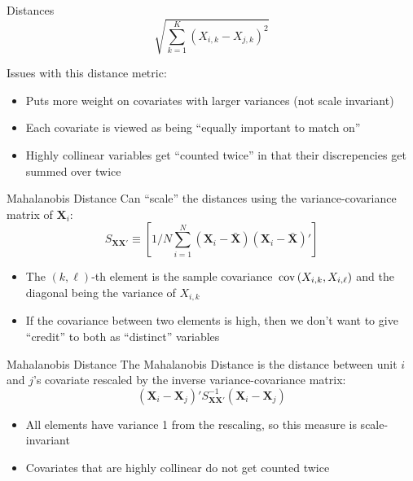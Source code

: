 \documentclass[aspectratio=169,t,11pt,table]{beamer}
\begin{document}
\begin{frame}{Distances}
  $$
    \sqrt{\sum_{k = 1}^K (X_{i,k} - X_{j, k})^2}
  $$

  \bigskip
  Issues with this distance metric:
  \begin{itemize}
    \item Puts more weight on covariates with larger variances (not scale invariant)
    
    \item Each covariate is viewed as being ``equally important to match on''
    
    \item Highly collinear variables get ``counted twice'' in that their discrepencies get summed over twice 
  \end{itemize}

\end{frame}

\begin{frame}{Mahalanobis Distance}
  Can ``scale'' the distances using the variance-covariance matrix of $\bm{X}_i$:
  $$
    S_{\bm{X}\bm{X}'} \equiv \left[ 1/N \sum_{i=1}^N (\bm{X}_i - \bar{\bm{X}}) (\bm{X}_i - \bar{\bm{X}})' \right]
  $$
  \begin{itemize}
    \item The $(k, \ell)$-th element is the sample covariance $\cov{X_{i, k}, X_{i, \ell}}$ and the diagonal being the variance of $X_{i, k}$
    
    \item If the covariance between two elements is high, then we don't want to give ``credit'' to both as ``distinct'' variables
  \end{itemize}
\end{frame}

\begin{frame}{Mahalanobis Distance}
  The \alert{Mahalanobis Distance} is the distance between unit $i$ and $j$'s covariate rescaled by the inverse variance-covariance matrix:
  $$
    (\bm{X}_i - \bm{X}_j)' S_{\bm{X}\bm{X}'}^{-1} (\bm{X}_i - \bm{X}_j)
  $$
  \begin{itemize}
    \item All elements have variance 1 from the rescaling, so this measure is scale-invariant
    
    \item Covariates that are highly collinear do not get counted twice
    
  \end{itemize}
\end{frame}
\end{document}
